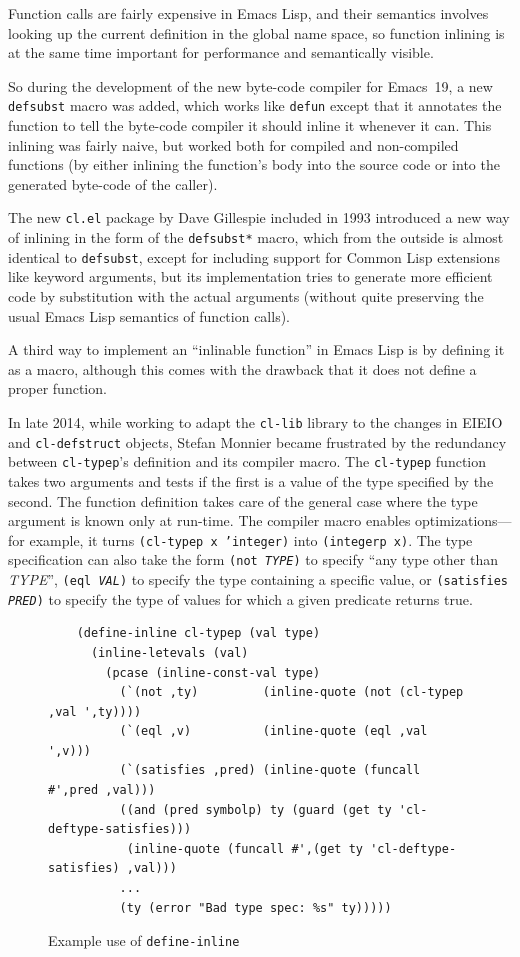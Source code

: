 \documentclass[format=acmsmall,screen]{acmart}
\newcommand \Elisp {Emacs Lisp}
\newcommand \id[1] {\textrm{\textsl{#1}}}
\begin{document}
Function calls are fairly expensive in \Elisp{}, and their semantics
involves looking up the current definition in the global name space, so
function inlining is at the same time important for performance and
semantically visible.

So during the development of the new byte-code compiler for Emacs~19, a new
\texttt{defsubst} macro was added, which works like \texttt{defun} except
that it annotates the function to tell the byte-code compiler it should inline it whenever it
can.  This inlining was fairly naive, but worked both for compiled and
non-compiled functions (by either inlining the function's body into the
source code or into the generated byte-code of the caller).

The new \texttt{cl.el} package by Dave Gillespie included in 1993 introduced
a new way of inlining in the form of the \texttt{defsubst*} macro, which
from the outside is
almost identical to \texttt{defsubst}, except for including
support for Common Lisp extensions like keyword arguments, but its
implementation tries to generate more efficient code by substitution with
the actual arguments (without quite preserving the usual Emacs Lisp semantics of
function calls).

A third way to implement an ``inlinable function'' in \Elisp{} is by
defining it as a macro, although this comes with the drawback that it does
not define a proper function.

In late 2014, while working to adapt the \texttt{cl-lib} library to the
changes in EIEIO and \texttt{cl-defstruct} objects, Stefan Monnier became
frustrated by the redundancy between \texttt{cl-typep}'s definition and its
compiler macro.
The \texttt{cl-typep} function takes two arguments and tests if the first is
a value of the type specified by the second.  The function definition takes
care of the general case where the type argument is known only at run-time.
The compiler macro enables optimizations---for example, it turns
\texttt{(cl-typep x 'integer)} into \texttt{(integerp x)}.  The type
specification can also take the form \texttt{(not \id{TYPE})} to
specify ``any type other than \id{TYPE}'', \texttt{(eql \id{VAL})} to
specify the type containing a specific value, or \texttt{(satisfies
  \id{PRED})} to specify the type of values for which a given
predicate returns true.

\begin{figure}
\begin{verbatim}
    (define-inline cl-typep (val type)
      (inline-letevals (val)
        (pcase (inline-const-val type)
          (`(not ,ty)         (inline-quote (not (cl-typep ,val ',ty))))
          (`(eql ,v)          (inline-quote (eql ,val ',v)))
          (`(satisfies ,pred) (inline-quote (funcall #',pred ,val)))
          ((and (pred symbolp) ty (guard (get ty 'cl-deftype-satisfies)))
           (inline-quote (funcall #',(get ty 'cl-deftype-satisfies) ,val)))
          ...
          (ty (error "Bad type spec: %s" ty)))))
\end{verbatim}
  \caption{Example use of \texttt{define-inline}}
  \label{fig:define-inline}
\end{figure}
\end{document}
